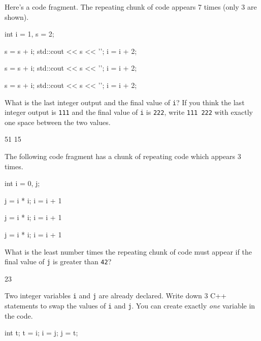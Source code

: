 \nextq
Here's a code fragment.
The repeating chunk of code appears 7 times (only 3 are shown).
\begin{console}[commandchars=\@\{\},fontsize=\small]
int i = 1, s = 2;

s = s + i;
std::cout << s << '\n';
i = i + 2;

s = s + i;
std::cout << s << '\n';
i = i + 2;

s = s + i;
std::cout << s << '\n';
i = i + 2;
\end{console}
What is the last integer output and the final value of \verb!i!?
If you think the last integer output is \verb!111! and the final
value of \verb!i! is \verb!222!,
write \verb!111 222! with exactly one space between the two values.
\\
\ANSWER
\begin{answercode}
51 15
\end{answercode}

\nextq
The following code fragment has a chunk of repeating code
which appears 3 times.
\begin{console}[commandchars=\@\{\},fontsize=\small]
int i = 0, j;

j = i * i;
i = i + 1

j = i * i;
i = i + 1

j = i * i;
i = i + 1
\end{console}
What is the least number times the repeating chunk of code must appear if
the final value of \verb!j! is greater than \verb!42!?
\\
\ANSWER
\begin{answercode}
23
\end{answercode}

\nextq
Two integer variables \verb$i$ and \verb$j$ are already declared.
Write down 3 C++ statements to swap the values of
\verb$i$ and \verb$j$.
You can create exactly \textit{one} variable in the code.
\\
\ANSWER
\begin{answercode}
int t;
t = i;
i = j;
j = t;
\end{answercode}


